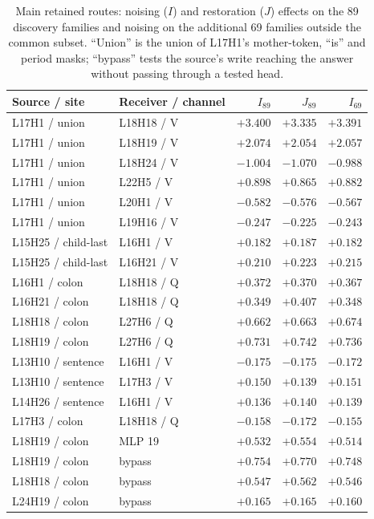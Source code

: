 \begin{table}[h]
\centering\scriptsize
\setlength{\tabcolsep}{3pt}
\begin{tabular}{@{}llrrr@{}}
\toprule
Source / site & Receiver / channel & $I_{89}$ & $J_{89}$ & $I_{69}$ \\
\midrule
L17H1 / union & L18H18 / V & $+3.400$ & $+3.335$ & $+3.391$ \\
L17H1 / union & L18H19 / V & $+2.074$ & $+2.054$ & $+2.057$ \\
L17H1 / union & L18H24 / V & $-1.004$ & $-1.070$ & $-0.988$ \\
L17H1 / union & L22H5 / V & $+0.898$ & $+0.865$ & $+0.882$ \\
L17H1 / union & L20H1 / V & $-0.582$ & $-0.576$ & $-0.567$ \\
L17H1 / union & L19H16 / V & $-0.247$ & $-0.225$ & $-0.243$ \\
L15H25 / child-last & L16H1 / V & $+0.182$ & $+0.187$ & $+0.182$ \\
L15H25 / child-last & L16H21 / V & $+0.210$ & $+0.223$ & $+0.215$ \\
L16H1 / colon & L18H18 / Q & $+0.372$ & $+0.370$ & $+0.367$ \\
L16H21 / colon & L18H18 / Q & $+0.349$ & $+0.407$ & $+0.348$ \\
L18H18 / colon & L27H6 / Q & $+0.662$ & $+0.663$ & $+0.674$ \\
L18H19 / colon & L27H6 / Q & $+0.731$ & $+0.742$ & $+0.736$ \\
L13H10 / sentence & L16H1 / V & $-0.175$ & $-0.175$ & $-0.172$ \\
L13H10 / sentence & L17H3 / V & $+0.150$ & $+0.139$ & $+0.151$ \\
L14H26 / sentence & L16H1 / V & $+0.136$ & $+0.140$ & $+0.139$ \\
L17H3 / colon & L18H18 / Q & $-0.158$ & $-0.172$ & $-0.155$ \\
L18H19 / colon & MLP 19 & $+0.532$ & $+0.554$ & $+0.514$ \\
L18H19 / colon & bypass & $+0.754$ & $+0.770$ & $+0.748$ \\
L18H18 / colon & bypass & $+0.547$ & $+0.562$ & $+0.546$ \\
L24H19 / colon & bypass & $+0.165$ & $+0.165$ & $+0.160$ \\
\bottomrule
\end{tabular}
\caption{Main retained routes: noising ($I$) and restoration ($J$) effects on the 89
discovery families and noising on the additional 69 families outside the common
subset. ``Union'' is the union of L17H1's mother-token, ``is'' and period masks;
``bypass'' tests the source's write reaching the answer without passing through a
tested head.}
\label{tab:routes-app}
\end{table}

